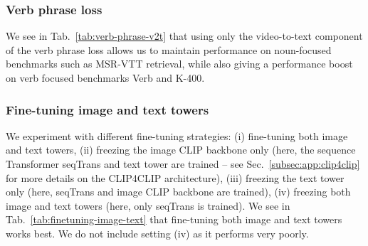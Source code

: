 \subsubsection{Verb phrase loss}\label{subsec:verb-phrase-ablation}
We see in Tab.~\ref{tab:verb-phrase-v2t} that using only the video-to-text component of the verb phrase loss allows us to maintain performance on noun-focused benchmarks such as MSR-VTT retrieval, while also giving a performance boost on verb focused benchmarks Verb and K-400. 

\begin{table}
    \setlength{\tabcolsep}{4pt}
    \centering
     \vspace{0.2cm}
    \caption{
    \textbf{Verb phrase loss.}
We report MSR-VTT T2V retrieval on the 1k split, multi-choice accuracy on Verb~\cite{park-etal-2022-exposing} and Kinetics-400 top-1 accuracy. We observe that using only the video-to-text component of the verb phrase loss allows us to maintain performance on noun-focused benchmarks such as MSR-VTT retrieval, while also giving a performance boost on Verb and K-400. For experiments including hard negatives, we note that one hard negative is sampled for each video here.}
    \label{tab:verb-phrase-v2t}
\end{table}



\subsubsection{Fine-tuning image and text towers}\label{subsec:freezing}
We experiment with different fine-tuning strategies: (i) fine-tuning both image and text towers, (ii) freezing the image CLIP backbone only (here, the sequence Transformer seqTrans and text tower are trained -- see Sec.~\ref{subsec:app:clip4clip} for more details on the CLIP4CLIP architecture), (iii) freezing the text tower only (here, seqTrans and image CLIP backbone are trained), (iv) freezing both image and text towers (here, only seqTrans is trained). We see in Tab.~\ref{tab:finetuning-image-text} that fine-tuning both image and text towers works best. We do not include setting (iv) as it performs very poorly.


